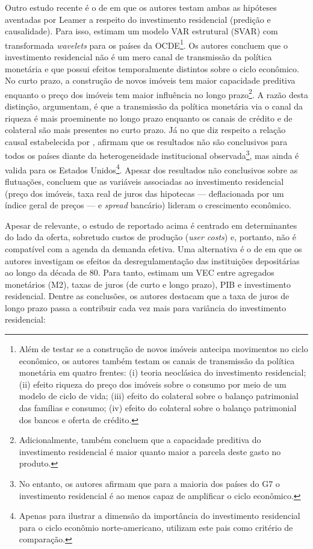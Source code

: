 Outro estudo recente é o de \textcite{huang_is_2018} em que os autores testam ambas as hipóteses aventadas por Leamer a respeito do investimento residencial (predição e causalidade). Para isso, estimam um modelo VAR estrutural (SVAR) com transformada \textit{wavelets} para os países da OCDE\footnote{
	Além de testar se a construção de novos imóveis antecipa movimentos no ciclo econômico, os autores também testam os canais de transmissão da política monetária em quatro frentes: (i) teoria neoclásica do investimento residencial; (ii) efeito riqueza do preço dos imóveis sobre o consumo por meio de um modelo de ciclo de vida; (iii) efeito do colateral sobre o balanço patrimonial das famílias e consumo; (iv) efeito do colateral sobre o balanço patrimonial dos bancos e oferta de crédito.}.  
Os autores concluem que o investimento residencial não é um mero canal de transmissão da política monetária e que possui efeitos temporalmente distintos sobre o ciclo econômico. No curto prazo, a construção de novos imóveis tem maior capacidade preditiva enquanto o preço dos imóveis tem maior influência no longo prazo\footnote{Adicionalmente, \textcite{huang_is_2018} também concluem que a capacidade preditiva do investimento residencial é maior quanto maior a parcela deste gasto no produto.}. A razão desta distinção, argumentam, é que a transmissão da política monetária via o canal da riqueza é mais proeminente no longo prazo enquanto os canais de crédito e de colateral são mais presentes no curto prazo. Já no que diz respeito a relação causal estabelecida por \textcite{leamer_housing_2007}, afirmam que os resultados não são conclusivos para todos os países diante da heterogeneidade institucional observada\footnote{
	No entanto, os autores afirmam que para a maioria dos países do G7 o investimento residencial é ao menos capaz de amplificar o ciclo econômico.}, mas ainda é valida para os Estados Unidos\footnote{
	Apenas para ilustrar a dimensão da importância do investimento residencial para o ciclo econômio norte-americano, \textcite{huang_is_2018} utilizam este pais como critério de comparação.}.
Apesar dos resultados não conclusivos sobre as flutuações, concluem que as variáveis associadas ao investimento residencial (preço dos imóveis, taxa real de juros das hipotecas --- deflacionada por um índice geral de preços --- e \textit{spread} bancário) lideram o crescimento econômico.

Apesar de relevante, o estudo  de \textcite{huang_is_2018} reportado acima é centrado em determinantes do lado da oferta, sobretudo custos de produção (\textit{user costs}) e, portanto, não é compatível com a agenda da demanda efetiva.
Uma alternativa é o de \textcite{gauger_residential_2003} em que os autores investigam os efeitos da desregulamentação das instituições depositárias ao longo da década de 80. Para tanto, estimam um VEC entre agregados monetários (M2), taxas de juros (de curto e longo prazo), PIB e investimento residencial.
Dentre as conclusões, os autores destacam que a taxa de juros de longo prazo passa a contribuir cada vez mais para variância do investimento residencial:

